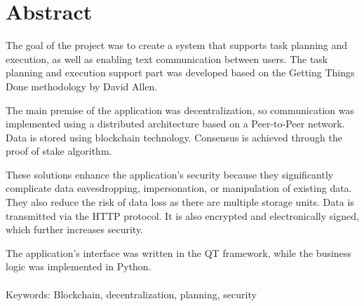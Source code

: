 \chapter*{Abstract}

The goal of the project was to create a system that supports task planning and execution, as well as enabling text communication between users. The task planning and execution support part was developed based on the Getting Things Done methodology by David Allen.

The main premise of the application was decentralization, so communication was implemented using a distributed architecture based on a Peer-to-Peer network. Data is stored using blockchain technology. Consensus is achieved through the proof of stake algorithm.

These solutions enhance the application's security because they significantly complicate data eavesdropping, impersonation, or manipulation of existing data. They also reduce the risk of data loss as there are multiple storage units. Data is transmitted via the HTTP protocol. It is also encrypted and electronically signed, which further increases security.

The application's interface was written in the QT framework, while the business logic was implemented in Python.
\\\\
Keywords: Blockchain, decentralization, planning, security